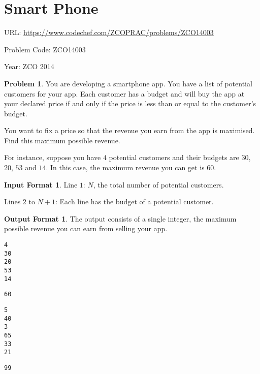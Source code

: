 \documentclass[twoside,12pt,a4paper,english]{book}
\theoremstyle{definition}
\theoremstyle{problemstyle}
\newtheorem*{problem}{Problem} %
\theoremstyle{problemstyle}
\newtheorem*{input_st}{Input Format} %
\theoremstyle{problemstyle}
\newtheorem*{output_st}{Output Format} %
\begin{document}
\newpage

\section{Smart Phone}

URL: \url{https://www.codechef.com/ZCOPRAC/problems/ZCO14003}

Problem Code: ZCO14003

Year: ZCO 2014

\begin{problem}
You are developing a smartphone app. You have a list of potential customers for your app. Each customer has a budget and will buy the app at your declared price if and only if the price is less than or equal to the customer's budget.

You want to fix a price so that the revenue you earn from the app is maximised. Find this maximum possible revenue.

For instance, suppose you have $4$ potential customers and their budgets are $30$, $20$, $53$ and $14$. In this case, the maximum revenue you can get is 60.
\end{problem}


\begin{input_st}
Line $1$: $N$, the total number of potential customers.

Lines $2$ to $N+1$: Each line has the budget of a potential customer.
\end{input_st}

\begin{output_st}
The output consists of a single integer, the maximum possible revenue you can earn from selling your app.
\end{output_st}

\begin{tcolorbox}[title=Example]
\begin{lstlisting}
4
30
20
53
14
\end{lstlisting}
\tcblower
\begin{lstlisting}
60
\end{lstlisting}
\end{tcolorbox}

\begin{tcolorbox}[title=Example]
\begin{lstlisting}
5
40
3
65
33
21
\end{lstlisting}
\tcblower
\begin{lstlisting}
99
\end{lstlisting}
\end{tcolorbox}
\end{document}
